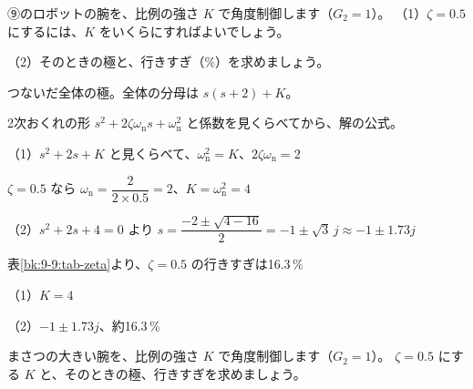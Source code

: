 \begin{reidai}
⑨のロボットの腕を、比例の強さ $K$ で角度制御します（$G_2=1$）。
（1）$\zeta=0.5$ にするには、$K$ をいくらにすればよいでしょう。\par
（2）そのときの極と、行きすぎ（\%）を求めましょう。\par
\kangaekata {}\par
{}\enspace つないだ全体の極。全体の分母は $s(s+2)+K$。\par
{}\enspace 2次おくれの形 $s^2+2\zeta\omega_{\mathrm n}s+\omega_{\mathrm n}^2$ と係数を見くらべてから、解の公式。\par
\shiki\kixjs{}\zw{} （1）$s^2+2s+K$ と見くらべて、$\omega_{\mathrm n}^2=K$、$2\zeta\omega_{\mathrm n}=2$\par
\kixjb $\zeta=0.5$ なら $\omega_{\mathrm n}=\dfrac{2}{2\times0.5}=2$、$K=\omega_{\mathrm n}^2=4$\par
\kixja （2）$s^2+2s+4=0$ より $s=\dfrac{-2\pm\sqrt{4-16}}{2}=-1\pm\sqrt3\,j\approx-1\pm1.73j$\par
\kixjb 表\ref{bk:9-9:tab-zeta}より、$\zeta=0.5$ の行きすぎは16.3\,\%\par
\kotae\kixjs{}\zw{} （1）$K=4$\par
\kixja （2）$-1\pm1.73j$、約16.3\,\%
\end{reidai}

\begin{jibun}
まさつの大きい腕を、比例の強さ $K$ で角度制御します（$G_2=1$）。
$\zeta=0.5$ にする $K$ と、そのときの極、行きすぎを求めましょう。
\end{jibun}

